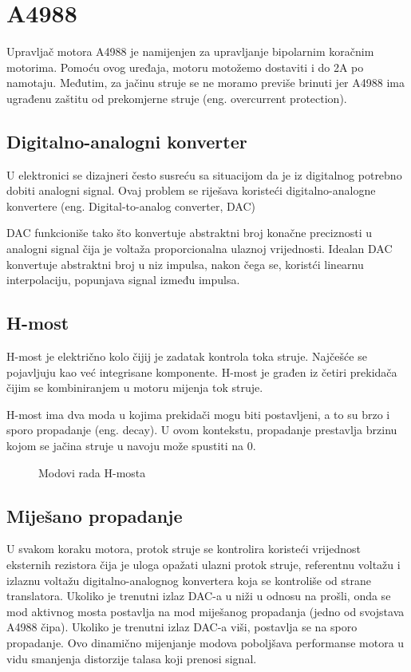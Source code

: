 \documentclass[../Document.tex]{subfiles}
\begin{document}
\section{A4988} \label{acdoo}
Upravljač motora A4988 je namijenjen za upravljanje bipolarnim koračnim motorima. Pomoću ovog uređaja, motoru motožemo dostaviti i do 2A po namotaju. Međutim, za jačinu struje se ne moramo previše brinuti jer A4988 ima ugrađenu zaštitu od prekomjerne struje (eng. overcurrent protection).

\subsection{Digitalno-analogni konverter}
U elektronici se dizajneri često susreću sa situacijom da je iz digitalnog potrebno dobiti analogni signal. Ovaj problem se riješava koristeći digitalno-analogne konvertere (eng. Digital-to-analog converter, DAC)

DAC funkcioniše tako što konvertuje abstraktni broj konačne preciznosti u analogni signal čija je voltaža proporcionalna ulaznoj vrijednosti. Idealan DAC konvertuje abstraktni broj u niz impulsa, nakon čega se, koristći linearnu interpolaciju, popunjava signal između impulsa.

\subsection{H-most}
H-most je električno kolo čijij je zadatak kontrola toka struje. Najčešće se pojavljuju kao već integrisane komponente. H-most je građen iz četiri prekidača čijim se kombiniranjem u motoru mijenja tok struje.


H-most ima dva moda u kojima prekidači mogu biti postavljeni, a to su brzo i sporo propadanje (eng. decay). U ovom kontekstu, propadanje prestavlja brzinu kojom se jačina struje u navoju može spustiti na 0.

\begin{figure}
    \centering
    \qquad
    \caption{Modovi rada H-mosta}
\end{figure}

\subsection{Miješano propadanje}
U svakom koraku motora, protok struje se kontrolira koristeći vrijednost eksternih rezistora čija je uloga opažati ulazni protok struje, referentnu voltažu i izlaznu voltažu digitalno-analognog konvertera koja se kontroliše od strane translatora. Ukoliko je trenutni izlaz DAC-a u niži u odnosu na prošli, onda se mod aktivnog mosta postavlja na mod miješanog propadanja (jedno od svojstava A4988 čipa). Ukoliko je trenutni izlaz DAC-a viši, postavlja se na sporo propadanje. Ovo dinamično mijenjanje modova poboljšava performanse motora u vidu smanjenja distorzije talasa koji prenosi signal.
\end{document}
